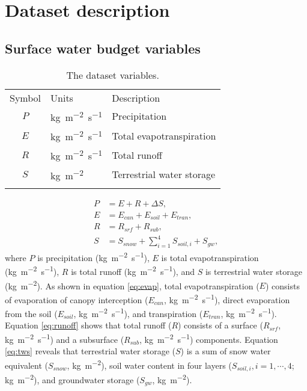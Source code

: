 \documentclass[essd]{copernicus}
\begin{document}
\section{Dataset description} \label{sec:data}

\subsection{Surface water budget variables}

\begin{table}[t]
    \caption{The dataset variables.}
    \label{tbl:variables}
    \centering
    \begin{tabular}{cll}
        \tophline
        Symbol & Units                   & Description               \\
        \middlehline
        $P$    & \unit{kg~m^{-2}~s^{-1}} & Precipitation             \\
        $E$    & \unit{kg~m^{-2}~s^{-1}} & Total evapotranspiration  \\
        $R$    & \unit{kg~m^{-2}~s^{-1}} & Total runoff              \\
        $S$    & \unit{kg~m^{-2}}        & Terrestrial water storage \\
        \bottomhline
    \end{tabular}
\end{table}

\begin{align}
    P & = E + R + \Delta S \label{eq:watbal},                          \\
    E & = E_{can} + E_{soil} + E_{tran} \label{eq:evap},               \\
    R & = R_{srf} + R_{sub} \label{eq:runoff},                         \\
    S & = S_{snow} + \sum_{i=1}^{4}S_{soil,i} + S_{gw} \label{eq:tws},
\end{align}
where $P$ is precipitation (\unit{kg~m^{-2}~s^{-1}}), $E$ is total evapotranspiration (\unit{kg~m^{-2}~s^{-1}}), $R$ is total runoff (\unit{kg~m^{-2}~s^{-1}}), and $S$ is terrestrial water storage (\unit{kg~m^{-2}}). As shown in equation \eqref{eq:evap}, total evapotranspiration ($E$) consists of evaporation of canopy interception ($E_{can}$, \unit{kg~m^{-2}~s^{-1}}), direct evaporation from the soil ($E_{soil}$, \unit{kg~m^{-2}~s^{-1}}), and transpiration ($E_{tran}$, \unit{kg~m^{-2}~s^{-1}}). Equation \eqref{eq:runoff} shows that total runoff ($R$) consists of a surface ($R_{srf}$, \unit{kg~m^{-2}~s^{-1}}) and a subsurface ($R_{sub}$, \unit{kg~m^{-2}~s^{-1}}) components. Equation \eqref{eq:tws} reveals that terrestrial water storage ($S$) is a sum of snow water equivalent ($S_{snow}$, \unit{kg~m^{-2}}), soil water content in four layers ($S_{soil,i}, i=1,\cdots,4$; \unit{kg~m^{-2}}), and groundwater storage ($S_{gw}$, \unit{kg~m^{-2}}).
\end{document}
